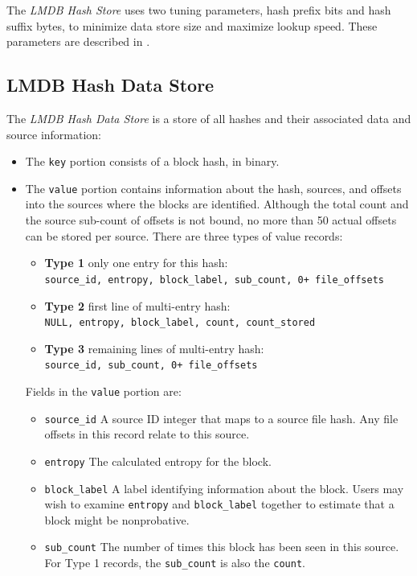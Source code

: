 \documentclass[11pt,fleqn]{article} %
\begin{document}
The \textit{LMDB Hash Store} uses two tuning parameters, hash prefix bits and hash suffix bytes, to minimize data store size and maximize lookup speed.  These parameters are described in \textbf{}.\\


\subsection{LMDB Hash Data Store}
The \textit{LMDB Hash Data Store} is a store of all hashes and their associated data and source information:

\begin{itemize}
\item The \verb+key+ portion consists of a block hash, in binary.
\item The \verb+value+ portion contains information about the hash, sources, and offsets into the sources where the blocks are identified. Although the total count and the source sub-count of offsets is not bound, no more than 50 actual offsets can be stored per source.  There are three types of value records:
  \begin{itemize}
  \item \textbf{Type 1} only one entry for this hash:\\
\verb-source_id, entropy, block_label, sub_count, 0+ file_offsets-
  \item \textbf{Type 2} first line of multi-entry hash:\\
\verb-NULL, entropy, block_label, count, count_stored-
  \item \textbf{Type 3} remaining lines of multi-entry hash:\\
\verb-source_id, sub_count, 0+ file_offsets-
  \end{itemize}
Fields in the \verb+value+ portion are:
  \begin{itemize}
  \item \verb+source_id+ A source ID integer that maps to a source file hash. Any file offsets in this record relate to this source.
  \item \verb+entropy+ The calculated entropy for the block.
  \item \verb+block_label+ A label identifying information about the block.  Users may wish to examine \verb+entropy+ and \verb+block_label+ together to estimate that a block might be nonprobative.
  \item \verb+sub_count+ The number of times this block has been seen in this source. For Type 1 records, the \verb+sub_count+ is also the \verb+count+.

\end{itemize}
\end{itemize}
\end{document}

